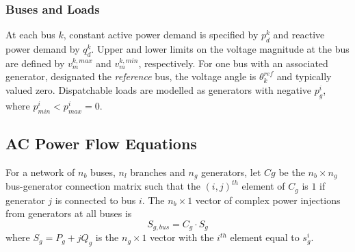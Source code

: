 \subsubsection{Buses and Loads}
At each bus $k$, constant active power demand is specified by
$p^k_d$ and reactive power demand by $q^k_d$.  Upper and lower
limits on the voltage magnitude at the bus are defined by $v_m^{k,max}$ and
$v_m^{k,min}$, respectively.  For one bus with an associated generator,
designated the \textit{reference} bus, the voltage angle is $\theta^{ref}_k$
and typically valued zero.
Dispatchable loads are modelled as generators with negative $p^i_g$, where
$p^i_{min} < p^i_{max} = 0$. %

\subsection{AC Power Flow Equations}
For a network of $n_b$ buses, $n_l$ branches and $n_g$ generators, let $Cg$ be
the $n_b \times n_g$ bus-generator connection matrix such that the $(i,j)^{th}$
element of $C_{g}$ is $1$ if generator $j$ is connected to bus $i$.  The
$n_b \times 1$ vector of complex power injections from generators at all buses
is
\begin{equation}
S_{g,bus} = C_g \cdot S_g
\end{equation}
where $S_g = P_g + jQ_g$ is the $n_g \times 1$ vector with the $i^{th}$ element
equal to $s^i_g$.

